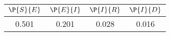 \begin{tabular}{cccc}
\hline
$\P{S}{E}$&$\P{E}{I}$&$\P{I}{R}$&$\P{I}{D}$\\
\hline
0.501&0.201&0.028&0.016\\
\hline
\end{tabular}